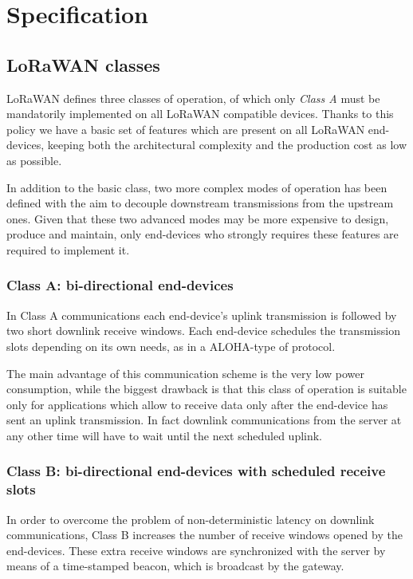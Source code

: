 \section{Specification}

\subsection{LoRaWAN classes}
LoRaWAN defines three classes of operation, of which only \emph{Class A} must be mandatorily implemented on all LoRaWAN compatible devices. Thanks to this policy we have a basic set of features which are present on all LoRaWAN end-devices, keeping both the architectural complexity and the production cost as low as possible.

In addition to the basic class, two more complex modes of operation has been defined with the aim to decouple downstream transmissions from the upstream ones. Given that these two advanced modes may be more expensive to design, produce and maintain, only end-devices who strongly requires these features are required to implement it.

\subsubsection{Class A: bi-directional end-devices}
In Class A communications each end-device's uplink transmission is followed by two short downlink receive windows. Each end-device schedules the transmission slots depending on its own needs, as in a ALOHA-type of protocol.

The main advantage of this communication scheme is the very low power consumption, while the biggest drawback is that this class of operation is suitable only for applications which allow to receive data only after the end-device has sent an uplink transmission. In fact downlink communications from the server at any other time will have to wait until the next scheduled uplink.


\subsubsection{Class B: bi-directional end-devices with scheduled receive slots}
In order to overcome the problem of non-deterministic latency on downlink communications, Class B increases the number of receive windows opened by the end-devices. These extra receive windows are synchronized with the server by means of a time-stamped beacon, which is broadcast by the gateway.


